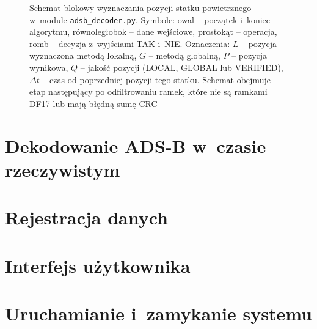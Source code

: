 \begin{figure}[!htb]
\caption{Schemat blokowy wyznaczania pozycji statku powietrznego w~module
\texttt{adsb\_decoder.py}. Symbole: owal -- początek i~koniec algorytmu,
równoległobok -- dane wejściowe, prostokąt -- operacja, romb -- decyzja
z~wyjściami TAK i~NIE. Oznaczenia: $L$ -- pozycja wyznaczona metodą lokalną,
$G$ -- metodą globalną, $P$ -- pozycja wynikowa, $Q$ -- jakość pozycji
(LOCAL, GLOBAL lub VERIFIED), $\Delta t$ -- czas od poprzedniej pozycji tego
statku. Schemat obejmuje etap następujący po odfiltrowaniu ramek, które nie
są ramkami DF17 lub mają błędną sumę CRC}
\label{rys:schemat_pozycja}
\end{figure}

\section{Dekodowanie ADS-B w~czasie rzeczywistym}
\label{sec:dekodowanie}

\section{Rejestracja danych}
\label{sec:rejestracja}

\section{Interfejs użytkownika}
\label{sec:interfejs}

\section{Uruchamianie i~zamykanie systemu}
\label{sec:start_stop}
